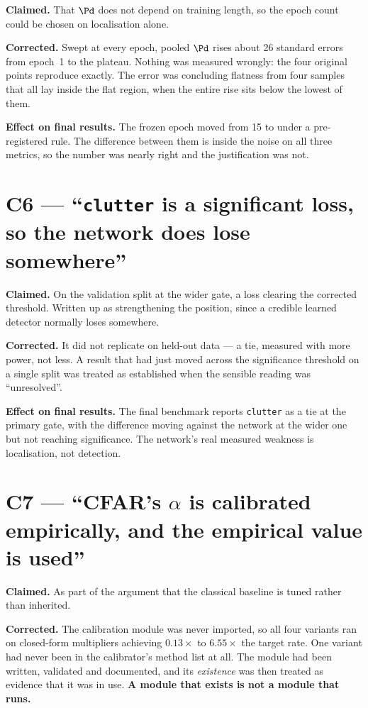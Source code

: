 \textbf{Claimed.} That $\Pd$ does not depend on training length, so the epoch count could be chosen
on localisation alone.

\textbf{Corrected.} Swept at every epoch, pooled $\Pd$ rises about 26 standard errors from epoch~1
to the plateau. Nothing was measured wrongly: the four original points reproduce exactly. The error
was concluding flatness from four samples that all lay inside the flat region, when the entire rise
sits below the lowest of them.

\textbf{Effect on final results.} The frozen epoch moved from 15 to \TinyEpochs{} under a
pre-registered rule. The difference between them is inside the noise on all three metrics, so the
number was nearly right and the justification was not.

\section{C6 --- ``\texttt{clutter} is a significant loss, so the network does lose somewhere''}

\textbf{Claimed.} On the validation split at the wider gate, a loss clearing the corrected
threshold. Written up as strengthening the position, since a credible learned detector normally
loses somewhere.

\textbf{Corrected.} It did not replicate on held-out data --- a tie, measured with more power, not
less. A result that had just moved across the significance threshold on a single split was treated
as established when the sensible reading was ``unresolved''.

\textbf{Effect on final results.} The final benchmark reports \texttt{clutter} as a tie at the
primary gate, with the difference moving against the network at the wider one but not reaching
significance. The network's real measured weakness is localisation, not detection.

\section{C7 --- ``CFAR's $\alpha$ is calibrated empirically, and the empirical value is used''}

\textbf{Claimed.} As part of the argument that the classical baseline is tuned rather than
inherited.

\textbf{Corrected.} The calibration module was never imported, so all four variants ran on
closed-form multipliers achieving $0.13\times$ to $6.55\times$ the target rate. One variant had
never been in the calibrator's method list at all. The module had been written, validated and
documented, and its \emph{existence} was then treated as evidence that it was in use. \textbf{A
module that exists is not a module that runs.}

